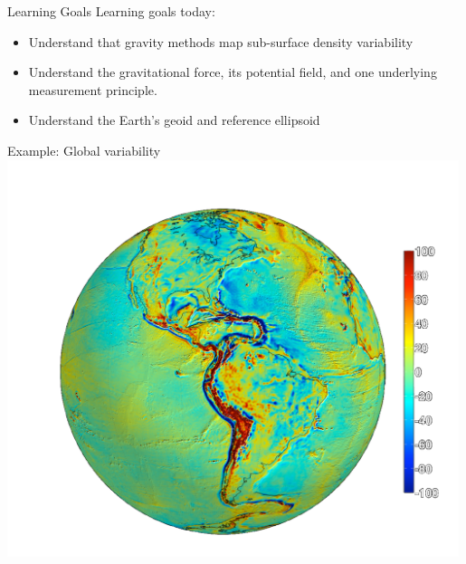 \begin{frame}
  \begin{PointSix}{Learning Goals}
    \small
    \alert{Learning goals today:}
    \begin{itemize}
      \item Understand that gravity methods map sub-surface density variability
      \item Understand the gravitational force, its potential field, and one underlying measurement principle.
      \item Understand the Earth's geoid and reference ellipsoid
    \end{itemize}
  \end{PointSix}
  \end{frame}

\begin{frame}
  \begin{PointSix}{Example: Global variability}
      \includegraphics[width=0.99\textwidth]{Figures/Gravity/Exported/Grace_JPLCaltect_FODT10_WithoutPeople.png}
  \end{PointSix}
\end{frame}

